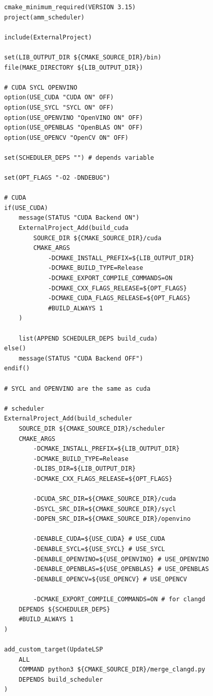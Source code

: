 \begin{lstlisting}[caption={CMakeLists.txt root directory}, label={lla}]
cmake_minimum_required(VERSION 3.15)
project(amm_scheduler)

include(ExternalProject)

set(LIB_OUTPUT_DIR ${CMAKE_SOURCE_DIR}/bin)
file(MAKE_DIRECTORY ${LIB_OUTPUT_DIR})

# CUDA SYCL OPENVINO
option(USE_CUDA "CUDA ON" OFF) 
option(USE_SYCL "SYCL ON" OFF)
option(USE_OPENVINO "OpenVINO ON" OFF)
option(USE_OPENBLAS "OpenBLAS ON" OFF)
option(USE_OPENCV "OpenCV ON" OFF)

set(SCHEDULER_DEPS "") # depends variable 

set(OPT_FLAGS "-O2 -DNDEBUG")

# CUDA
if(USE_CUDA)
    message(STATUS "CUDA Backend ON")
    ExternalProject_Add(build_cuda
        SOURCE_DIR ${CMAKE_SOURCE_DIR}/cuda
        CMAKE_ARGS
            -DCMAKE_INSTALL_PREFIX=${LIB_OUTPUT_DIR}
            -DCMAKE_BUILD_TYPE=Release
            -DCMAKE_EXPORT_COMPILE_COMMANDS=ON
            -DCMAKE_CXX_FLAGS_RELEASE=${OPT_FLAGS}
            -DCMAKE_CUDA_FLAGS_RELEASE=${OPT_FLAGS}
            #BUILD_ALWAYS 1
    )

    list(APPEND SCHEDULER_DEPS build_cuda)
else()
    message(STATUS "CUDA Backend OFF")
endif()

# SYCL and OPENVINO are the same as cuda

# scheduler
ExternalProject_Add(build_scheduler
    SOURCE_DIR ${CMAKE_SOURCE_DIR}/scheduler
    CMAKE_ARGS
        -DCMAKE_INSTALL_PREFIX=${LIB_OUTPUT_DIR}
        -DCMAKE_BUILD_TYPE=Release
        -DLIBS_DIR=${LIB_OUTPUT_DIR}
        -DCMAKE_CXX_FLAGS_RELEASE=${OPT_FLAGS}

        -DCUDA_SRC_DIR=${CMAKE_SOURCE_DIR}/cuda
        -DSYCL_SRC_DIR=${CMAKE_SOURCE_DIR}/sycl
        -DOPEN_SRC_DIR=${CMAKE_SOURCE_DIR}/openvino

        -DENABLE_CUDA=${USE_CUDA} # USE_CUDA
        -DENABLE_SYCL=${USE_SYCL} # USE_SYCL
        -DENABLE_OPENVINO=${USE_OPENVINO} # USE_OPENVINO
        -DENABLE_OPENBLAS=${USE_OPENBLAS} # USE_OPENBLAS
        -DENABLE_OPENCV=${USE_OPENCV} # USE_OPENCV

        -DCMAKE_EXPORT_COMPILE_COMMANDS=ON # for clangd
    DEPENDS ${SCHEDULER_DEPS}
    #BUILD_ALWAYS 1
)

add_custom_target(UpdateLSP
    ALL
    COMMAND python3 ${CMAKE_SOURCE_DIR}/merge_clangd.py
    DEPENDS build_scheduler 
)
\end{lstlisting}

